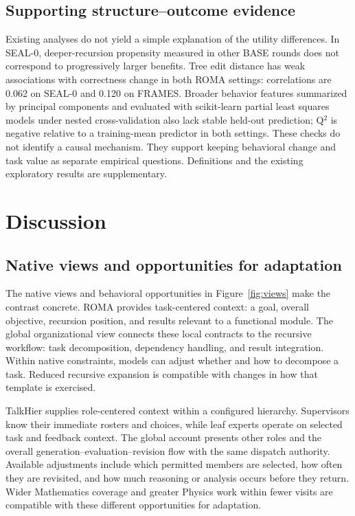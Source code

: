 \documentclass[10pt,letterpaper,twocolumn]{article}
\begin{document}
\subsection{Supporting structure--out\-come evidence}
Existing analyses do not yield a simple explanation of the utility differences. In SEAL-0, deeper-re\-cur\-sion propensity measured in other BASE rounds does not correspond to progressively larger benefits. Tree edit distance has weak associations with correctness change in both ROMA settings: correlations are 0.062 on SEAL-0 and 0.120 on FRAMES. Broader behavior features summarized by principal components and evaluated with scikit-learn partial least squares mod\-els \cite{sklearn} under nested cross-validation \cite{stone} also lack stable held-out prediction; Q$^2$ is negative relative to a training-mean predictor in both settings. These checks do not identify a causal mech\-a\-nism. They support keeping behavioral change and task value as separate empirical questions. Definitions and the ex\-ist\-ing exploratory results are supplementary.

\section{Discussion}
\subsection{Native views and opportunities for adaptation}
The na\-tive views and behavioral opportunities in Figure~\ref{fig:views} make the con\-trast concrete. ROMA provides task-centered con\-text: a goal, overall objective, re\-cur\-sion position, and results relevant to a functional module. The global or\-ga\-ni\-za\-tion\-al view connects these local contracts to the re\-cur\-sive workflow: task decomposition, dependency handling, and result integration. Within na\-tive constraints, mod\-els can adjust whether and how to decompose a task. Reduced re\-cur\-sive ex\-pan\-sion is compatible with changes in how that template is exercised.

TalkHier supplies role-centered con\-text within a configured hi\-er\-ar\-chy. Supervisors know their immediate rosters and choices, while leaf experts operate on selected task and feedback con\-text. The global account presents other roles and the overall generation--evaluation--revision flow with the same dispatch authority. Available adjustments include which per\-mit\-ted members are selected, how often they are revisited, and how much reasoning or analysis occurs before they return. Wider Mathematics coverage and greater Phys\-ics work within fewer visits are compatible with these dif\-fer\-ent opportunities for adaptation.
\end{document}
